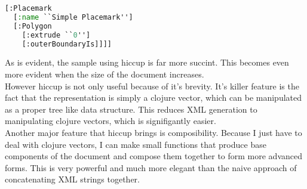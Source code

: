 \begin{lstlisting}[language=Lisp, caption= The equivalent placemark with hiccup. Notice the brevity and lack of repetition]
[:Placemark
  [:name ``Simple Placemark'']
  [:Polygon
    [:extrude ``0'']
    [:outerBoundaryIs]]]]
\end{lstlisting}

As is evident, the sample using hiccup is far more succint. This becomes even more evident when the size of the document increases. \\

However hiccup is not only useful because of it's brevity. It's killer feature is the fact that the representation is simply a clojure vector, which can be manipulated as a proper tree like data structure. This reduces XML generation to manipulating clojure vectors, which is signifigantly easier.\\

Another major feature that hiccup brings is composibility. Because I just have to deal with clojure vectors, I can make small functions that produce base components of the document and compose them together to form more advanced forms. This is very powerful and much more elegant than the naive approach of concatenating XML strings together. \\
